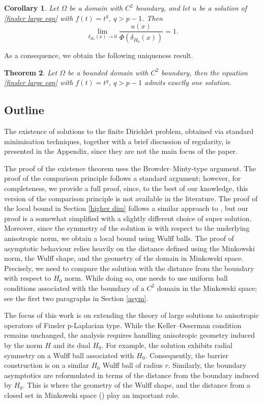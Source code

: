 \documentclass[11pt]{amsart}
\newtheorem{theorem}{Theorem}[section]
\newtheorem{corollary}[theorem]{Corollary}
\numberwithin{equation}{section}
\begin{document}
  \begin{corollary}\label{thrm asym for f=tq}
        Let $\Omega$ be a domain with $C^{2}$ boundary, and let $u$ be a solution of \eqref{finsler large eqn} with $f(t)=t^{q}$, $q>p-1$. Then 
        \begin{equation}\label{asym f=tq}
            \lim_{\delta_{H_{0}}(x)\to 0}\frac{u(x)}{\Phi(\delta_{H_{0}}(x))}=1.
        \end{equation}
    \end{corollary}
    As a consequence, we obtain the following uniqueness result.
 \begin{theorem}\label{thrm uniqueness}
     Let $\Omega$ be a bounded domain with $C^{2}$ boundary, then the equation \eqref{finsler large eqn} with $f(t)=t^{q}$, $q>p-1$ admits exactly one solution.
 \end{theorem}

\subsection{Outline}
 The existence of solutions to the finite Dirichlet problem, obtained via standard minimisation techniques, together with a brief discussion of regularity, is presented in the Appendix, since they are not the main focus of the paper.

The proof of the existence theorem uses the Browder–Minty-type argument. The proof of the comparison principle follows a standard argument; however, for completeness, we provide a full proof, since, to the best of our knowledge, this version of the comparison principle is not available in the literature.
The proof of the local bound in Section \ref{higher dim} follows a similar approach to \cite{DattaIndro2026}, but our proof is a somewhat simplified with a slightly different choice of super solution. Moreover, since the symmetry of the solution is with respect to the underlying anisotropic norm, we obtain a local bound using Wulff balls. The proof of asymptotic behaviour relies heavily on the distance defined using the Minkowski norm, the Wulff shape, and the geometry of the domain in Minkowski space. Precisely, we need to compare the solution with the distance from the boundary with respect to $H_{0}$ norm. While doing so, one needs to use uniform ball conditions associated with the boundary of a $C^{2}$ domain in the Minkowski space; see the first two paragraphs in Section \ref{asym}.

The focus of this work is on extending the theory of large solutions to anisotropic operators of Finsler p-Laplacian type. While the Keller–Osserman condition remains unchanged, the analysis requires handling anisotropic geometry induced by the norm $H$ and its dual $H_{0}$. For example, the solution exhibits radial symmetry on a Wulff ball associated with $H_{0}$. Consequently, the barrier construction is on a similar $H_{0}$ Wulff ball of radius $r$. Similarly, the boundary asymptotics are reformulated in terms of the distance from the boundary induced by $H_{0}$. This is where the geometry of the Wulff shape, and the distance from a closed set in Minkowski space (\cite{CrastaMalusa2007}) play an important role.
\end{document}
